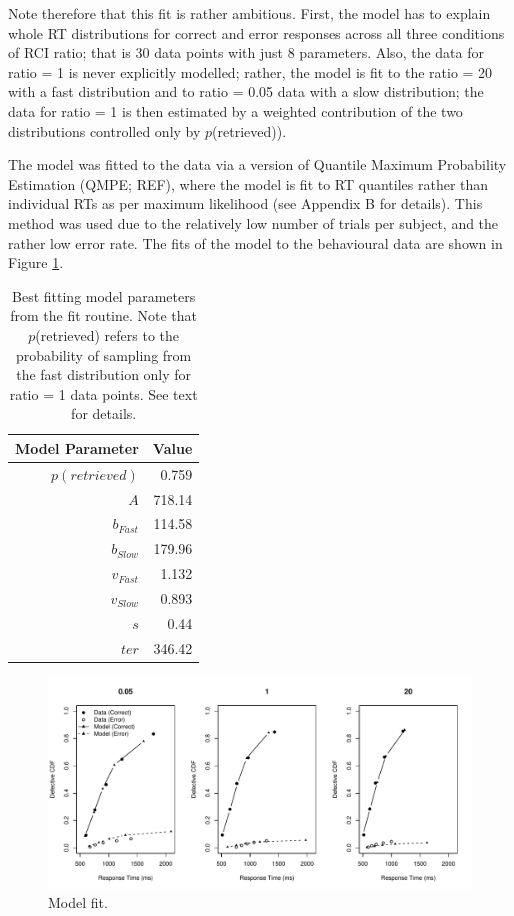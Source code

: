 \documentclass[a4paper, jou, natbib]{apa6}
\begin{document}
Note therefore that this fit is rather ambitious. First, the model has to explain whole RT distributions for correct and error responses across all three conditions of RCI ratio; that is 30 data points with just 8 parameters. Also, the data for ratio = 1 is never explicitly modelled; rather, the model is fit to the ratio = 20 with a fast distribution and to ratio = 0.05 data with a slow distribution; the data for ratio = 1 is then estimated by a weighted contribution of the two distributions controlled only by $p$(retrieved)). 

The model was fitted to the data via a version of Quantile Maximum Probability Estimation (QMPE; REF), where the model is fit to RT quantiles rather than individual RTs as per maximum likelihood (see Appendix B for details). This method was used due to the relatively low number of trials per subject, and the rather low error rate. The fits of the model to the behavioural data are shown in Figure \ref{fig:modelFit}. 

\begin{table}[htbp]
  \centering
  \caption{Best fitting model parameters from the fit routine. Note that $p$(retrieved) refers to the probability of sampling from the fast distribution only for ratio = 1 data points. See text for details.}
    \begin{tabular}{rr}
    \toprule
    Model Parameter & Value \\
    \midrule
    $p(retrieved)$     & 0.759 \\
    $A$     & 718.14 \\
    $b_{Fast}$ & 114.58 \\
    $b_{Slow}$ & 179.96 \\
    $v_{Fast}$ & 1.132 \\
    $v_{Slow}$ & 0.893 \\
    $s$     & 0.44 \\
    $ter$   & 346.42 \\
    \bottomrule
    \end{tabular}%
  \label{tab:bestParameters}%
\end{table}%




\begin{figure}
\begin{center}
\includegraphics[width = \textwidth]{Images/qmp2RCI_drift_+_b.pdf}
\caption{Model fit.}
\label{fig:modelFit}
\end{center}
\end{figure}
\end{document}
